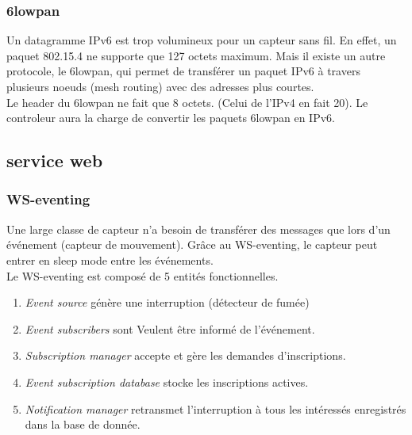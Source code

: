 \begin{frame}
 \frametitle{6lowpan}
 Un datagramme IPv6 est trop volumineux pour un capteur sans fil.
 En effet, un paquet 802.15.4 ne supporte que 127 octets maximum.
 Mais il existe un autre protocole, le 6lowpan, qui permet de transférer un paquet IPv6 à travers plusieurs noeuds (mesh routing) avec des adresses plus courtes.\\
 \vspace{5mm}
 Le header du 6lowpan ne fait que 8 octets. (Celui de l'IPv4 en fait 20).
 Le controleur aura la charge de convertir les paquets 6lowpan en IPv6.
\end{frame}
\subsection{service web}
\begin{frame}
 \frametitle{WS-eventing}
 Une large classe de capteur n'a besoin de transférer des messages que lors d'un événement (capteur de mouvement). Grâce au WS-eventing, le capteur peut entrer en sleep mode entre les événements.\\
 Le WS-eventing est composé de 5 entités fonctionnelles.
 \begin{enumerate}
  \item \textit{Event source} génère une interruption (détecteur de fumée)
  \item \textit{Event subscribers} sont Veulent être informé de l'événement.
  \item \textit{Subscription manager} accepte et gère les demandes d'inscriptions.
  \item \textit{Event subscription database} stocke les inscriptions actives.
  \item \textit{Notification manager} retransmet l'interruption à tous les intéressés enregistrés dans la base de donnée.
 \end{enumerate}
\end{frame}

